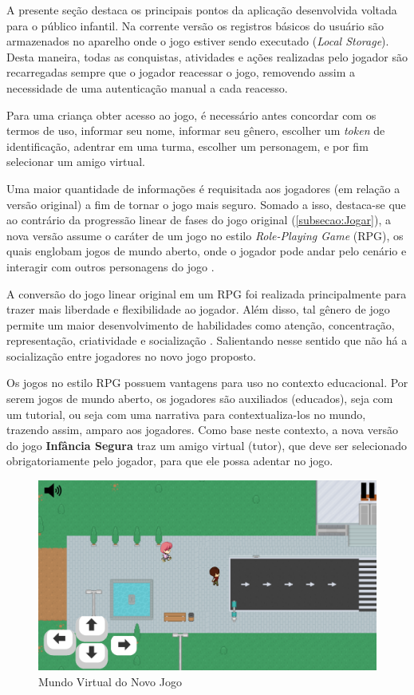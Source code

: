 \documentclass[alpha-refs,brazilian]{RBCA_v2.0}
\begin{document}
A presente seção destaca os principais pontos da aplicação desenvolvida voltada para o público infantil. Na corrente versão os registros básicos do usuário são armazenados no aparelho onde o jogo estiver sendo executado (\textit{Local Storage}). Desta maneira, todas as conquistas, atividades e ações realizadas pelo jogador são recarregadas sempre que o jogador reacessar o jogo, removendo assim a necessidade de uma autenticação manual a cada reacesso. 

Para uma criança obter acesso ao jogo, é necessário antes concordar com os termos de uso, informar seu nome, informar seu gênero, escolher um \textit{token} de identificação, adentrar em uma turma, escolher um personagem, e por fim selecionar um amigo virtual. 

Uma maior quantidade de informações é requisitada aos jogadores (em relação a versão original) a fim de tornar o jogo mais seguro. Somado a isso, destaca-se que ao contrário da progressão linear de fases do jogo original (\cref{subsecao:Jogar}), a nova versão assume o caráter de um jogo no estilo \textit{Role-Playing Game} (RPG), os quais englobam jogos de mundo aberto, onde o jogador pode andar pelo cenário e interagir com outros personagens do jogo \citep{morais2018desenvolvimento}.

A conversão do jogo linear original em um RPG foi realizada principalmente para trazer mais liberdade e flexibilidade ao jogador. Além disso, tal gênero de jogo permite um maior desenvolvimento de habilidades como atenção, concentração, representação, criatividade e socialização \citep{pessini2015ferramenta}. Salientando nesse sentido que não há a socialização entre jogadores no novo jogo proposto.  

Os jogos no estilo RPG possuem vantagens para uso no contexto educacional. Por serem jogos de mundo aberto, os jogadores são auxiliados (educados), seja com um tutorial, ou seja com uma narrativa para contextualiza-los no mundo, trazendo assim, amparo aos jogadores. Como base neste contexto, a nova versão do jogo \textbf{Infância Segura} traz um  amigo virtual (tutor), que deve ser selecionado obrigatoriamente pelo jogador, para que ele possa adentar no jogo. 

 \begin{figure}[h]
  \centering
  \includegraphics[width=\linewidth]{NovoJogo/Mundo.png}
  \caption{Mundo Virtual do Novo Jogo}
  \label{fig:MundoNovoJogo}
\end{figure}
\end{document}
